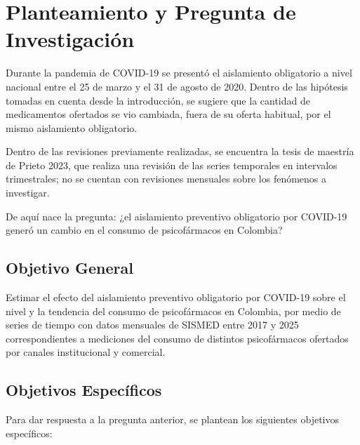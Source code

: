\documentclass[10pt,twoside,xcolor=table,x11anmes]{IEEEtran}
\begin{document}
\section[Planteamiento y Pregunta de Investigación]{Planteamiento y Pregunta de Investigación}

Durante la pandemia de COVID-19 se presentó el aislamiento obligatorio a nivel nacional entre el 25 de marzo y el 31 de agosto de 2020. Dentro de las hipótesis tomadas en cuenta desde la introducción, se sugiere que la cantidad de medicamentos ofertados se vio cambiada, fuera de su oferta habitual, por el mismo aislamiento obligatorio. 

Dentro de las revisiones previamente realizadas, se encuentra la tesis de maestría de Prieto 2023, que realiza una revisión de las series temporales en intervalos trimestrales; no se cuentan con revisiones mensuales sobre los fenómenos a investigar. 

De aquí nace la pregunta: ¿el aislamiento preventivo obligatorio por COVID-19 generó un cambio en el consumo de psicofármacos en Colombia? 

\subsection{Objetivo General}

Estimar el efecto del aislamiento preventivo obligatorio por COVID-19 sobre el nivel y la tendencia del consumo de psicofármacos en Colombia, por medio de series de tiempo con datos mensuales de SISMED entre 2017 y 2025 correspondientes a mediciones del consumo de distintos psicofármacos ofertados por canales institucional y comercial.

\subsection{Objetivos Específicos}

Para dar respuesta a la pregunta anterior, se plantean los siguientes objetivos específicos:
\end{document}
